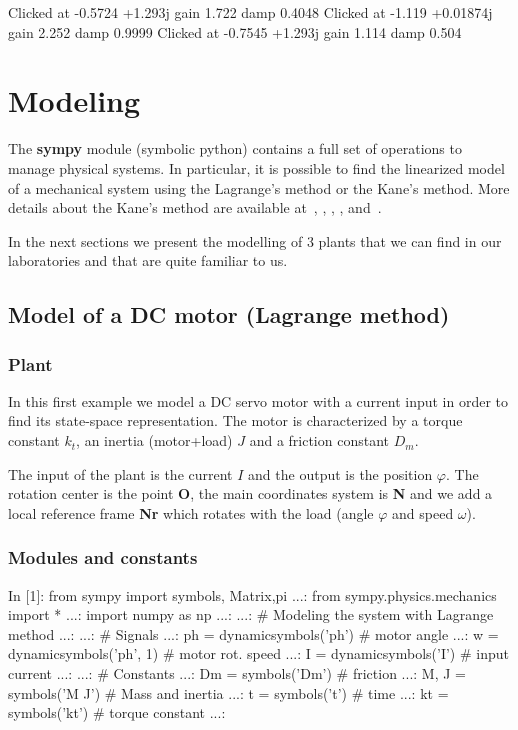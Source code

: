 \begin{code}
Clicked at    -0.5724    +1.293j gain      1.722 damp     0.4048
Clicked at     -1.119  +0.01874j gain      2.252 damp     0.9999
Clicked at    -0.7545    +1.293j gain      1.114 damp      0.504
\end{code}

\chapter{Modeling}
The \textbf{sympy} module (symbolic python) contains a full set of operations 
to manage physical systems.
In particular,  it is possible to find the linearized model of a 
mechanical system using the Lagrange's method or the Kane's method.
More details about the Kane's method are available at~\cite{KANE1}, 
\cite{KANE2}, \cite{KANE6}, \cite{KANE3}, \cite{KANE4} and~\cite{KANE5}.

In the next sections we present the modelling of 3 plants that we can find in 
our laboratories and that are quite familiar to us.

\section{Model of a DC motor (Lagrange method)} 
\subsection{Plant}
In this first example we model a DC servo motor with a current input in order 
to find its state-space representation. The motor is characterized by a torque 
constant $k_t$, an inertia (motor+load) $J$ and a friction constant $D_m$.

The input of the plant is the current $I$ and the output is the position 
$\varphi$. The rotation center is the point \textbf{O}, the main coordinates 
system is \textbf{N} and we add a local reference frame \textbf{Nr} which 
rotates with the load (angle $\varphi$ and speed $\omega$).

\subsection{Modules and constants}
\begin{code}
In [1]: from sympy import symbols, Matrix,pi
   ...: from sympy.physics.mechanics import *
   ...: import numpy as np
   ...: 
   ...: # Modeling the system with Lagrange method
   ...: 
   ...: # Signals
   ...: ph = dynamicsymbols('ph')    # motor angle
   ...: w  = dynamicsymbols('ph', 1)     # motor rot. speed
   ...: I  = dynamicsymbols('I')     # input current
   ...: 
   ...: # Constants
   ...: Dm = symbols('Dm')           # friction
   ...: M, J = symbols('M J')        # Mass and inertia
   ...: t = symbols('t')             # time
   ...: kt  = symbols('kt')          # torque constant
   ...: 
\end{code}

